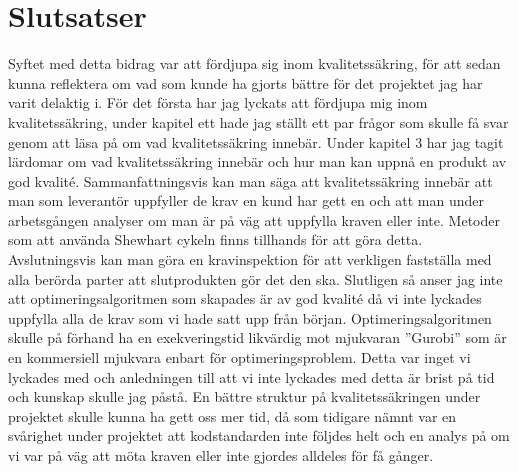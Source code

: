 \section{Slutsatser}
Syftet med detta bidrag var att fördjupa sig inom kvalitetssäkring, för att sedan kunna reflektera om vad som kunde ha gjorts bättre för det projektet jag har varit delaktig i.
\newline
\newline
För det första har jag lyckats att fördjupa mig inom kvalitetssäkring, under kapitel ett hade jag ställt ett par frågor som skulle få svar genom att läsa på om vad kvalitetssäkring innebär. Under kapitel 3 har jag tagit lärdomar om vad kvalitetssäkring innebär och hur man kan uppnå en produkt av god kvalité. Sammanfattningsvis kan man säga att kvalitetssäkring innebär att man som leverantör uppfyller de krav en kund har gett en och att man under arbetsgången analyser om man är på väg att uppfylla kraven eller inte. Metoder som att använda Shewhart cykeln finns tillhands för att göra detta. Avslutningsvis kan man göra en kravinspektion för att verkligen fastställa med alla berörda parter att slutprodukten gör det den ska.
\newline
\newline
Slutligen så anser jag inte att optimeringsalgoritmen som skapades är av god kvalité då vi inte lyckades uppfylla alla de krav som vi hade satt upp från början. Optimeringsalgoritmen skulle på förhand ha en exekveringstid likvärdig mot mjukvaran ''Gurobi'' som är en kommersiell mjukvara enbart för optimeringsproblem. Detta var inget vi lyckades med och anledningen till att vi inte lyckades med detta är brist på tid och kunskap skulle jag påstå. En bättre struktur på kvalitetssäkringen under projektet skulle kunna ha gett oss mer tid, då som tidigare nämnt var en svårighet under projektet att kodstandarden inte följdes helt och en analys på om vi var på väg att möta kraven eller inte gjordes alldeles för få gånger.
